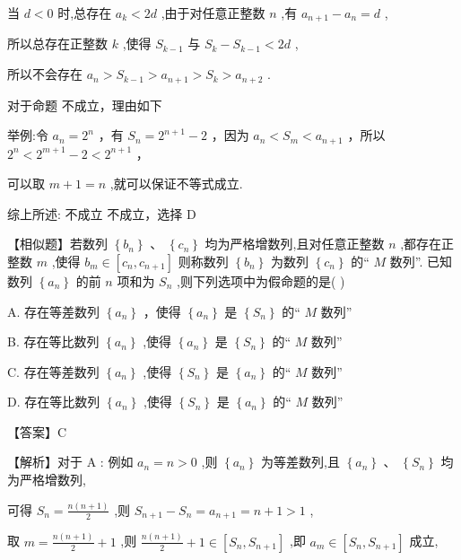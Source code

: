 \documentclass[10pt]{article}
\newcommand*\circled[1]{\tikz[baseline=(char.base)]{\node[shape=circle,draw,inner sep=1.5pt] (char) {\small #1};}}
\begin{document}
当 \(d < 0\) 时,总存在 \({a}_{k} < {2d}\) ,由于对任意正整数 \(n\) ,有 \({a}_{n + 1} - {a}_{n} = d\) ,

所以总存在正整数 \(k\) ,使得 \({S}_{k - 1}\) 与 \({S}_{k} - {S}_{k - 1} < {2d}\) ,

所以不会存在 \({a}_{n} > {S}_{k - 1} > {a}_{n + 1} > {S}_{k} > {a}_{n + 2}\) .

对于命题 \circled{2} 不成立，理由如下

举例:令 \({a}_{n} = {2}^{n}\) ，有 \({S}_{n} = {2}^{n + 1} - 2\) ，因为 \({a}_{n} < {S}_{m} < {a}_{n + 1}\) ，所以 \({2}^{n} < {2}^{m + 1} - 2 < {2}^{n + 1}\) ，

可以取 \(m + 1 = n\) ,就可以保证不等式成立.

综上所述:  \circled{1} 不成立 \circled{2} 不成立，选择 D

【相似题】若数列 \(\left\{  {b}_{n}\right\}\) 、 \(\left\{  {c}_{n}\right\}\) 均为严格增数列,且对任意正整数 \(n\) ,都存在正整数 \(m\) ,使得 \({b}_{m} \in  \left\lbrack  {{c}_{n},{c}_{n + 1}}\right\rbrack\) 则称数列 \(\left\{  {b}_{n}\right\}\) 为数列 \(\left\{  {c}_{n}\right\}\) 的“ \(M\) 数列”. 已知数列 \(\left\{  {a}_{n}\right\}\) 的前 \(n\) 项和为 \({S}_{n}\) ,则下列选项中为假命题的是(   )

A. 存在等差数列 \(\left\{  {a}_{n}\right\}\) ，使得 \(\left\{  {a}_{n}\right\}\) 是 \(\left\{  {S}_{n}\right\}\) 的“ \(M\) 数列”

B. 存在等比数列 \(\left\{  {a}_{n}\right\}\) ,使得 \(\left\{  {a}_{n}\right\}\) 是 \(\left\{  {S}_{n}\right\}\) 的“ \(M\) 数列”

C. 存在等差数列 \(\left\{  {a}_{n}\right\}\) ,使得 \(\left\{  {S}_{n}\right\}\) 是 \(\left\{  {a}_{n}\right\}\) 的“ \(M\) 数列”

D. 存在等比数列 \(\left\{  {a}_{n}\right\}\) ,使得 \(\left\{  {S}_{n}\right\}\) 是 \(\left\{  {a}_{n}\right\}\) 的“ \(M\) 数列”

【答案】C

【解析】对于 \(\mathrm{A}\) : 例如 \({a}_{n} = n > 0\) ,则 \(\left\{  {a}_{n}\right\}\) 为等差数列,且 \(\left\{  {a}_{n}\right\}  \text{ 、 }\left\{  {S}_{n}\right\}\) 均为严格增数列,

可得 \({S}_{n} = \frac{n\left( {n + 1}\right) }{2}\) ,则 \({S}_{n + 1} - {S}_{n} = {a}_{n + 1} = n + 1 > 1\) ,

取 \(m = \frac{n\left( {n + 1}\right) }{2} + 1\) ,则 \(\frac{n\left( {n + 1}\right) }{2} + 1 \in  \left\lbrack  {{S}_{n},{S}_{n + 1}}\right\rbrack\) ,即 \({a}_{m} \in  \left\lbrack  {{S}_{n},{S}_{n + 1}}\right\rbrack\) 成立,
\end{document}
